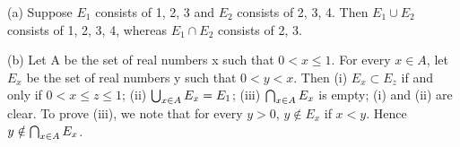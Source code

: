 \begin{example} %
  \label{ex:chap2:union_intersect_examples}
  (a) Suppose $E_1$ consists of 1, 2, 3 and $E_2$ consists of 2, 3,
  4. Then $E_1 \cup E_2$ consists of 1, 2, 3, 4, whereas $E_1 \cap
  E_2$ consists of 2, 3.

  (b) Let A be the set of real numbers x such that $0 < x \le 1$. For
  every $x \in A$, let $E_x$ be the set of real numbers y such that
  $0 < y < x$. Then
  (i) $E_x \subset E_z$ if and only if $0 < x \le z \le 1$;
  (ii) $\bigcup_{x \in A} E_x = E_1$;
  (iii) $\bigcap_{x \in A} E_x$ is empty;
  (i) and (ii) are clear. To prove (iii), we note that for every $y >
  0$, $y \notin E_x$ if $x < y$. Hence $y \notin \bigcap_{x \in A} E_x$.
\end{example}

